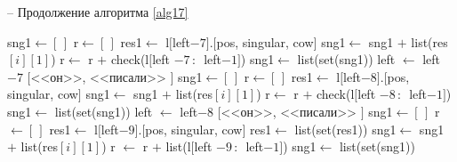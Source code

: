 \documentclass[main]{subfiles}
\begin{document}
\begin{algorithm}
	\caption{-- Продолжение алгоритма \ref{alg17}}\label{alg18}
	\begin{algorithmic}[1]
		\State sng1$\gets [\, ]$
		\State r$\gets [\, ]$
		\State res1$\gets$ l$[$left$-7]$.$[$pos, singular, cow$]$
		\State sng1$\gets$ sng1 $+$ list(res$[i][1]$)
		\State r$\gets$ r $+$ check(l$[$left $-7\, :\, $ left$-1 ]$)
		\EndIf
		\EndFor
		\State sng1$\gets$ list(set(sng1))
		\State left $\gets$ left$-7$
		\Else
		\State \Return $[$<<он>>, <<писали>> $]$
		\EndIf
		\State sng1$\gets [\, ]$
		\State r$\gets [\, ]$
		\State res1$\gets$ l$[$left$-8]$.$[$pos, singular, cow$]$
		\State sng1$\gets$ sng1 $+$ list(res$[i][1]$)
		\State r$\gets$ r $+$ check(l$[$left $-8\, :\, $ left$-1 ]$)
		\EndIf
		\EndFor
		\State sng1$\gets$ list(set(sng1))
		\State left $\gets$ left$-8$
		\Else
		\State \Return $[$<<он>>, <<писали>> $]$
		\EndIf
		\Else
		\State sng1$\gets [\,]$
		\State r $\gets [\, ]$ 
		\State res1$\gets$ l$[$left$-9]$.$[$pos, singular, cow$]$
		\State res1$\gets$ list(set(res1))
		\State sng1$\gets$ sng1 $+$ list(res$[i][1]$)
		\State r $\gets$ r $+$ list(l$[$left $-9\, :\, $ left$-1 ]$)
		\EndIf
		\EndFor	
		\State sng1$\gets$ list(set(sng1))
	\end{algorithmic}
\end{algorithm}
\pagebreak
\end{document}
